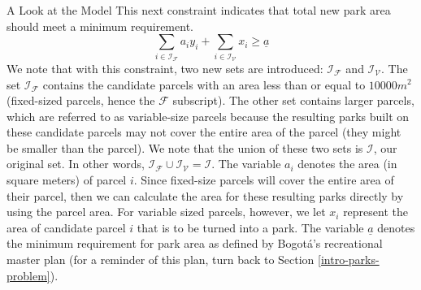 \documentclass[12pt]{pom_thesis}
\theoremstyle{definition}
\begin{document}
\begin{chapter}{A Look at the Model}
This next constraint indicates that total new park area should meet a minimum requirement.
\begin{equation} \label{constraint-9}
\sum_{i \in \mathcal{I_F}} a_iy_i + \sum_{i \in \mathcal{I_V}} x_i  \geq \underline{a}
\end{equation}
We note that with this constraint, two new sets are introduced: $\mathcal{I_F}$ and $\mathcal{I_V}$. The set $\mathcal{I_F}$ contains the candidate parcels with an area less than or equal to $10000m^2$ (fixed-sized parcels, hence the $\mathcal{F}$ subscript). The other set contains larger parcels, which are referred to as variable-size parcels because the resulting parks built on these candidate parcels may not cover the entire area of the parcel (they might be smaller than the parcel). We note that the union of these two sets is $\mathcal{I}$, our original set. In other words, $\mathcal{I_F} \cup \mathcal{I_V} = \mathcal{I}.$
The variable $a_i$ denotes the area (in square meters) of parcel $i$. Since fixed-size parcels will cover the entire area of their parcel, then we can calculate the area for these resulting parks directly by using the parcel area. For variable sized parcels, however, we let $x_i$ represent the area of candidate parcel $i$ that is to be turned into a park. The variable $\underline{a}$ denotes the minimum requirement for park area as defined by Bogot\'{a}'s recreational master plan (for a reminder of this plan, turn back to Section \ref{intro-parks-problem}). \\


\end{chapter}
\end{document}
